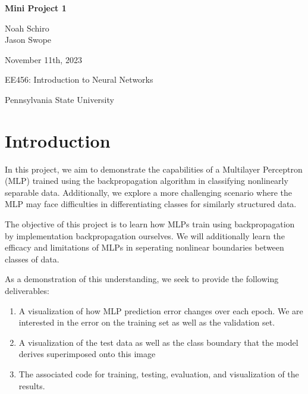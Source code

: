 \documentclass[letterpaper, 12pt]{article}
\begin{document}


\begin{titlepage}
    \begin{center}
        \vspace*{1in}
        \Huge{\textbf{Mini Project 1}}
        
        \vspace{0.5in}
        \Large{Noah Schiro}\\
        \Large{Jason Swope}
        
        \vfill
        
        \normalsize{November 11th, 2023}
        
        \vspace{0.5in}
        
        \normalsize{EE456: Introduction to Neural Networks}
        
        \vspace{0.5in}
        
        \normalsize{Pennsylvania State University}
        
    \end{center}
\end{titlepage}

\newpage

\setlength{\parindent}{5ex}

\section{Introduction}
In this project, we aim to demonstrate the capabilities of a Multilayer Perceptron (MLP) trained using the backpropagation algorithm in classifying nonlinearly separable data. Additionally, we explore a more challenging scenario where the MLP may face difficulties in differentiating classes for similarly structured data.

The objective of this project is to learn how MLPs train using backpropagation by implementation backpropagation ourselves. We will additionally learn the efficacy and limitations of MLPs in seperating nonlinear boundaries between classes of data. 

As a demonstration of this understanding, we seek to provide the following deliverables:

\begin{enumerate}
\item A visualization of how MLP prediction error changes over each epoch. We are interested in the error on the training set as well as the validation set. 
\item A visualization of the test data as well as the class boundary that the model derives superimposed onto this image
\item The associated code for training, testing, evaluation, and visualization of the results.
\end{enumerate}
\end{document}
